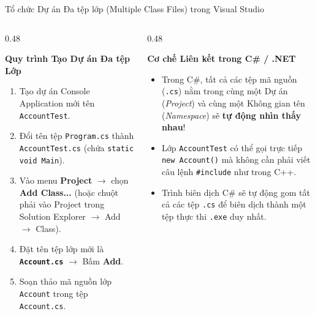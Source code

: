 \documentclass[aspectratio=169, 10pt]{beamer}
\begin{document}
\begin{frame}{Tổ chức Dự án Đa tệp lớp (Multiple Class Files) trong Visual Studio}
  \begin{columns}[T]
    \begin{column}{0.48\textwidth}
      \begin{block}{\textbf{Quy trình Tạo Dự án Đa tệp Lớp}}
        \begin{enumerate}\small
          \item Tạo dự án Console Application mới tên \texttt{AccountTest}.
          \item Đổi tên tệp \texttt{Program.cs} thành \texttt{AccountTest.cs} (chứa \texttt{static void Main}).
          \item Vào menu \textbf{Project} $\to$ chọn \textbf{Add Class...} (hoặc chuột phải vào Project trong Solution Explorer $\to$ Add $\to$ Class).
          \item Đặt tên tệp lớp mới là \textbf{\texttt{Account.cs}} $\to$ Bấm \textbf{Add}.
          \item Soạn thảo mã nguồn lớp \texttt{Account} trong tệp \texttt{Account.cs}.
        \end{enumerate}
      \end{block}
    \end{column}

    \begin{column}{0.48\textwidth}
      \begin{exampleblock}{\textbf{Cơ chế Liên kết trong C\# / .NET}}
        \begin{itemize}\small
          \item Trong C\#, tất cả các tệp mã nguồn (\texttt{.cs}) nằm trong cùng một Dự án (\textit{Project}) và cùng một Không gian tên (\textit{Namespace}) sẽ \textbf{tự động nhìn thấy nhau}!
          \item Lớp \texttt{AccountTest} có thể gọi trực tiếp \texttt{new Account()} mà không cần phải viết câu lệnh \texttt{\#include} như trong C++.
          \item Trình biên dịch C\# sẽ tự động gom tất cả các tệp \texttt{.cs} để biên dịch thành một tệp thực thi \texttt{.exe} duy nhất.
        \end{itemize}
      \end{exampleblock}
    \end{column}
  \end{columns}
\end{frame}
\end{document}
